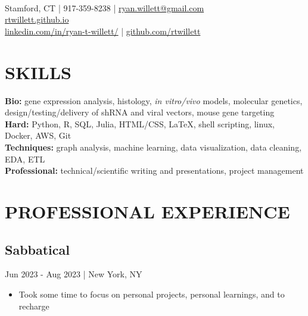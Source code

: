 \documentclass[11pt]{article}
\title{\vspace{-7cm}}
\date{}
\author{Ryan Willett}
\newenvironment{myitemize}
{ \begin{itemize}
	\setlength{\itemsep}{0pt}
	\setlength{\parskip}{0pt}
	\setlength{\parsep}{0pt}     }
{ \end{itemize}                  }
\begin{document}
\maketitle

\section*{}
  \\
\normalsize
Stamford, CT | 917-359-8238 | \href{mailto:ryan.willett@gmail.com}{ryan.willett@gmail.com} \\
\href{http://rtwillett.github.io}{rtwillett.github.io} \\
\href{https://linkedin.com/in/ryan-t-willett/}{linkedin.com/in/ryan-t-willett/} | \href{https://github.com/rtwillett}{github.com/rtwillett}

\raggedright
\vspace{-3truemm}


\section*{SKILLS}
\vspace{-3truemm}
{\bfseries Bio:} gene expression analysis, histology, \textit{in vitro/vivo} models, molecular genetics, design/testing/delivery of shRNA and viral vectors, mouse gene targeting \\
{\bfseries Hard:} Python, R, SQL, Julia, HTML/CSS, \LaTeX, shell scripting, linux, Docker, AWS, Git \\
{\bfseries Techniques:} graph analysis, machine learning, data visualization, data cleaning, EDA, ETL \\
{\bfseries Professional:} technical/scientific writing and presentations, project management

\section*{PROFESSIONAL EXPERIENCE}

\subsection*{Sabbatical}
\vspace{-3truemm}

{\bfseries}Jun 2023 - Aug 2023 | New York, NY
\begin{myitemize}
	\item Took some time to focus on personal projects, personal learnings, and to recharge
\end{myitemize}
\end{document}
